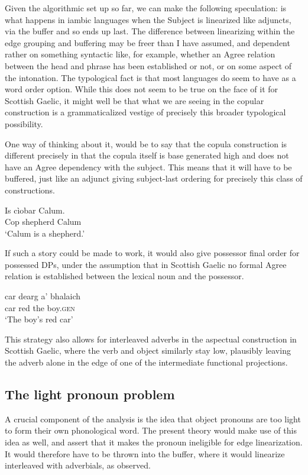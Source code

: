 \documentclass[output=paper,colorlinks,citecolor=brown]{langscibook}
\begin{document}
Given the algorithmic set up so far, we can make the following speculation:    is what happens in iambic languages when the Subject is linearized like adjuncts, via the buffer and so ends up last.  The difference between linearizing within the edge grouping and buffering may be freer than I have assumed, and dependent rather on something syntactic like, for example, whether an Agree relation between the head and phrase has been established or not, or on some aspect of the intonation.  The typological fact is that most  languages do seem to have  as a word order option.  While this does not seem to be true on the face of it for Scottish Gaelic, it might well be that what we are seeing in the copular construction is a grammaticalized vestige of precisely this broader typological possibility. 

One way of thinking about it, would be to say that the copula construction is different precisely in that the copula itself is base generated high and does not have an Agree dependency with the subject. This means that it will have to be buffered, just like an adjunct giving subject-last ordering for precisely this class of constructions. 

\ea
  \gll Is cìobar Calum.\\
  Cop shepherd Calum \\
  \glt `Calum is a shepherd.'
\z

If such a story could be made to work, it would also give possessor final order for possessed DPs, under the assumption that in Scottish Gaelic no formal Agree relation is established between the lexical noun  and the possessor.

\ea
  \gll car dearg a'  bhalaich \\
  car red the boy.\textsc{gen} \\
  \glt `The boy's red car'
\z

This strategy also allows for interleaved adverbs in the aspectual construction in Scottish Gaelic, where the verb and object similarly stay low, plausibly leaving the adverb alone in the edge of one of the intermediate functional projections. 
 
\subsection{The light pronoun problem}

A crucial component of the \citet{bennettetal16} analysis is the idea that object pronouns are too light to form their own phonological word.  The present theory would make use of this idea as well, and assert that it makes the pronoun ineligible for edge linearization. It would therefore have to be thrown into the buffer, where it would linearize interleaved with adverbials, as observed.
 
\end{document}
